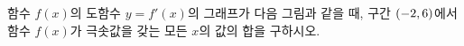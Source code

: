 함수 $f(x)$의 도함수 $y=f'(x)$의 그래프가 다음 그림과 같을 때, 구간 $(-2{,}\mkern3mu\mathopen{}6)$에서 함수 $f(x)$가 극솟값을 갖는 모든 $x$의 값의 합을 구하시오.
\par\smallskip\begin{center}\resizebox{\ifdim\width>\linewidth\linewidth\else\width\fi}{!}{}\end{center}
